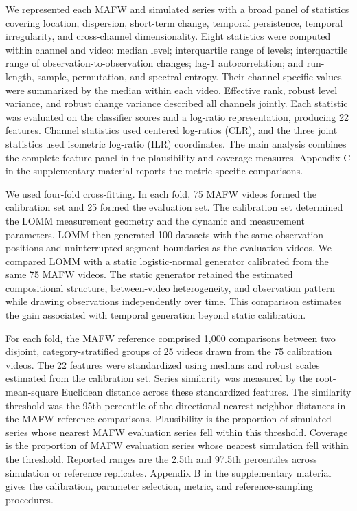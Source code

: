 \documentclass[
]{article}
\begin{document}
We represented each MAFW and simulated series with a broad panel of
statistics covering location, dispersion, short-term change, temporal
persistence, temporal irregularity, and cross-channel dimensionality.
Eight statistics were computed within channel and video: median level;
interquartile range of levels; interquartile range of
observation-to-observation changes; lag-1 autocorrelation; and
run-length, sample, permutation, and spectral entropy. Their
channel-specific values were summarized by the median within each video.
Effective rank, robust level variance, and robust change variance
described all channels jointly. Each statistic was evaluated on the
classifier scores and a log-ratio representation, producing 22 features.
Channel statistics used centered log-ratios (CLR), and the three joint
statistics used isometric log-ratio (ILR) coordinates. The main analysis
combines the complete feature panel in the plausibility and coverage
measures. Appendix C in the supplementary material reports the
metric-specific comparisons.

We used four-fold cross-fitting. In each fold, 75 MAFW videos formed the
calibration set and 25 formed the evaluation set. The calibration set
determined the LOMM measurement geometry and the dynamic and measurement
parameters. LOMM then generated 100 datasets with the same observation
positions and uninterrupted segment boundaries as the evaluation videos.
We compared LOMM with a static logistic-normal generator calibrated from
the same 75 MAFW videos. The static generator retained the estimated
compositional structure, between-video heterogeneity, and observation
pattern while drawing observations independently over time. This
comparison estimates the gain associated with temporal generation beyond
static calibration.

For each fold, the MAFW reference comprised 1,000 comparisons between
two disjoint, category-stratified groups of 25 videos drawn from the 75
calibration videos. The 22 features were standardized using medians and
robust scales estimated from the calibration set. Series similarity was
measured by the root-mean-square Euclidean distance across these
standardized features. The similarity threshold was the 95th percentile
of the directional nearest-neighbor distances in the MAFW reference
comparisons. Plausibility is the proportion of simulated series whose
nearest MAFW evaluation series fell within this threshold. Coverage is
the proportion of MAFW evaluation series whose nearest simulation fell
within the threshold. Reported ranges are the 2.5th and 97.5th
percentiles across simulation or reference replicates. Appendix B in the
supplementary material gives the calibration, parameter selection,
metric, and reference-sampling procedures.
\end{document}
